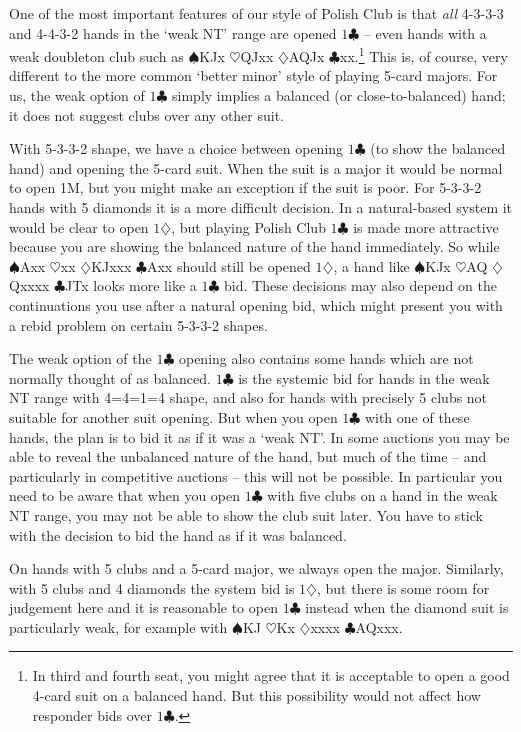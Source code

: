 \documentclass{article}
\newcommand{\sz}{\spadesuit}
\newcommand{\hz}{\heartsuit}
\newcommand{\dz}{\diamondsuit}
\newcommand{\cz}{\clubsuit}
\begin{document}
One of the most important features of our style of Polish Club is that \emph{all} 4-3-3-3 and 4-4-3-2 hands in the `weak NT' range are opened $1\cz$ -- even hands with a weak doubleton club such as $\sz$KJx $\hz$QJxx $\dz$AQJx $\cz$xx.\footnote{In third and fourth seat, you might agree that it is acceptable to open a good 4-card suit on a balanced hand. But this possibility would not affect how responder bids over $1\cz$.} This is, of course, very different to the more common `better minor' style of playing 5-card majors. For us, the weak option of $1\cz$ simply implies a balanced (or close-to-balanced) hand; it does not suggest clubs over any other suit.

With 5-3-3-2 shape, we have a choice between opening $1\cz$ (to show the balanced hand) and opening the 5-card suit. When the suit is a major it would be normal to open 1M, but you might make an exception if the suit is poor. For 5-3-3-2 hands with 5 diamonds it is a more difficult decision. In a natural-based system it would be clear to open $1\dz$, but playing Polish Club $1\cz$ is made more attractive because you are showing the balanced nature of the hand immediately. So while $\sz$Axx $\hz$xx $\dz$KJxxx $\cz$Axx should still be opened $1\dz$, a hand like $\sz$KJx $\hz$AQ $\dz$Qxxxx $\cz$JTx looks more like a $1\cz$ bid. These decisions may also depend on the continuations you use after a natural opening bid, which might present you with a rebid problem on certain 5-3-3-2 shapes.

The weak option of the $1\cz$ opening also contains some hands which are not normally thought of as balanced. $1\cz$ is the systemic bid for hands in the weak NT range with 4=4=1=4 shape, and also for hands with precisely 5 clubs not suitable for another suit opening. But when you open $1\cz$ with one of these hands, the plan is to bid it as if it was a `weak NT'. In some auctions you may be able to reveal the unbalanced nature of the hand, but much of the time -- and particularly in competitive auctions -- this will not be possible. In particular you need to be aware that when you open $1\cz$ with five clubs on a hand in the weak NT range, you may not be able to show the club suit later. You have to stick with the decision to bid the hand as if it was balanced.

On hands with 5 clubs and a 5-card major, we always open the major. Similarly, with 5 clubs and 4 diamonds the system bid is $1\dz$, but there is some room for judgement here and it is reasonable to open $1\cz$ instead when the diamond suit is particularly weak, for example with $\sz$KJ $\hz$Kx $\dz$xxxx $\cz$AQxxx.
\end{document}
